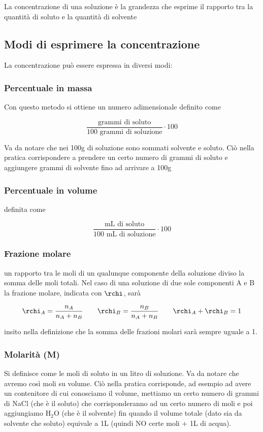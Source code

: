 La concentrazione di una soluzione è la grandezza che esprime il rapporto tra la quantità di soluto e la quantità di solvente
\subsection{Modi di esprimere la concentrazione}
La concentrazione può essere espressa in diversi modi:
\subsubsection{Percentuale in massa}
Con questo metodo si ottiene un numero adimensionale definito come

$$ \frac{\text{grammi di soluto}}{100\text{ grammi di soluzione}} \cdot 100$$

Va da notare che nei 100g di soluzione sono sommati solvente e soluto. Ciò nella pratica corrispondere a prendere un certo numero di grammi di soluto e aggiungere grammi di solvente fino ad arrivare a 100g
\subsubsection{Percentuale in volume}
\E definita come

$$ \frac{\text{mL di soluto}}{100\text{ mL di soluzione}} \cdot 100$$

\subsubsection{Frazione molare}
\E un rapporto tra le moli di un qualunque componente della soluzione diviso la somma delle moli totali. Nel caso di una soluzione di due sole componenti A e B la frazione molare, indicata con $\rchi$, sarà

$$\rchi_A=\frac{n_A}{n_A + n_B}
\qquad
\rchi_B=\frac{n_B}{n_A + n_B}
\qquad
\rchi_A + \rchi_B = 1$$

\E insito nella definizione che la somma delle frazioni molari sarà sempre uguale a 1.
\subsubsection{Molarità (M)}
Si definisce come le moli di soluto in un litro di soluzione. Va da notare che avremo così moli su volume. Ciò nella pratica corrisponde, ad esempio ad avere un contenitore di cui conosciamo il volume, mettiamo un certo numero di grammi di NaCl (che è il soluto) che corrisponderanno ad un certo numero di moli e poi aggiungiamo H$_2$O (che è il solvente) fin quando il volume totale (dato sia da solvente che soluto) equivale a 1L (quindi NO certe moli + 1L di acqua).
